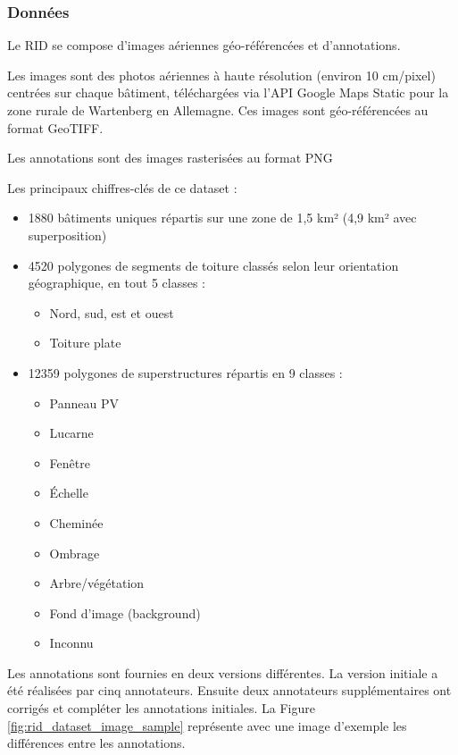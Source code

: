 \subsubsection{Données}
\par{Le RID se compose d'images aériennes géo-référencées et d'annotations.}
\par{Les images sont des photos aériennes à haute résolution (environ 10 cm/pixel) centrées sur chaque bâtiment, téléchargées via l'API Google Maps Static pour la zone rurale de Wartenberg en Allemagne. Ces images sont géo-référencées au format GeoTIFF.}
\par{Les annotations sont des images rasterisées au format PNG}

\par{Les principaux chiffres-clés de ce dataset :}
\begin{itemize}
    \item 1880 bâtiments uniques répartis sur une zone de 1,5 km² (4,9 km² avec superposition)
    \item 4520 polygones de segments de toiture classés selon leur orientation géographique, en tout 5 classes :
    \begin{itemize}
        \item Nord, sud, est et ouest
        \item Toiture plate
    \end{itemize}
    \item 12359 polygones de superstructures répartis en 9 classes :
    \begin{itemize}
        \item Panneau PV
        \item Lucarne
        \item Fenêtre
        \item Échelle
        \item Cheminée
        \item Ombrage
        \item Arbre/végétation
        \item Fond d'image (background)
        \item Inconnu
    \end{itemize}
\end{itemize}
\par{Les annotations sont fournies en deux versions différentes. La version initiale a été réalisées par cinq annotateurs. Ensuite deux annotateurs supplémentaires ont corrigés et compléter les annotations initiales. La Figure \ref{fig:rid_dataset_image_sample} représente avec une image d'exemple les différences entre les annotations.}

